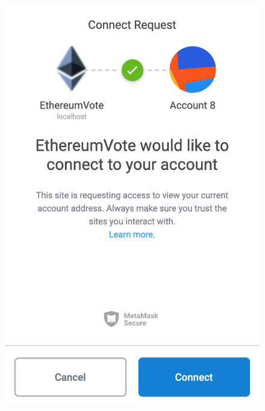 	\begin{figure}
		\centering
		\includegraphics[width=\linewidth/3]{img/screen_metamask2.png}

\end{figure}
